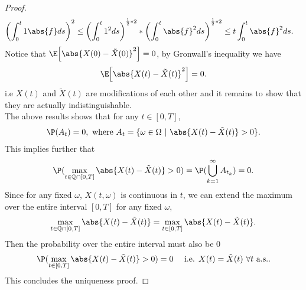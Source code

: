 \begin{proof}
\begin{align*}
   \left( \int_0^{t} 1 \abs{f} ds  \right)^2 &\le  \left( \int_0^{t} 1^2 ds  \right)^{\frac{1}{2}*2}*\left( \int_0^{t} \abs{f}^2 ds  \right)^{\frac{1}{2}*2} \le t \int_0^{t} \abs{f}^2 ds 
 .\end{align*}
Notice that $\E\Big[\abs{X(0)-\tilde{X}(0)}^2\Big]=0$, by Gronwall's inequality we have 
 \begin{align*}
   \E\Big[\abs{X(t)-\tilde{X}(t) }^2\Big] = 0
 .\end{align*}
 i.e $X(t)$ and $\tilde{X}(t) $ are modifications of each other and it remains to show that they are actually
 indistinguishable.\\[1ex]
The above results shows that for any $t\in [0,T]$,
 \begin{align*}
 \P(A_t) = 0, \mbox{ where } A_t = \{ \omega  \in  \Omega  \ | \ \abs{X(t) - \tilde{X}(t)  } > 0\}
 .\end{align*}
 This implies further that
 \begin{align*}
   \P(\max_{t \in  \mathbb{Q} \cap [0,T]} \abs{X(t)-\tilde{X}(t) } > 0 ) = \P(\bigcup_{k=1}^{\infty} A_{t_k} ) = 0
 .\end{align*}
Since for any fixed $\omega$, $X(t,\omega )$ is continuous in $t$, we can extend the maximum over the entire interval $[0,T]$ for any fixed $\omega$,
 \begin{align*}
   \max_{t \in  \mathbb{Q} \cap [0,T]} \abs{X(t) - \tilde{X}(t)} = \max_{t \in  [0,T]} \abs{X(t) - \tilde{X}(t)}
 .\end{align*}
 Then the probability over the entire interval must also be 0 
 \begin{align*}
   \P(\max_{t \in  [0,T]} \abs{X(t) - \tilde{X}(t)} >0)  = 0 \quad \text{ i.e. } X(t) = \tilde{X}(t) \ \forall  t \text{ a.s.} 
 .\end{align*}
 This concludes the uniqueness proof.
 

\end{proof}
